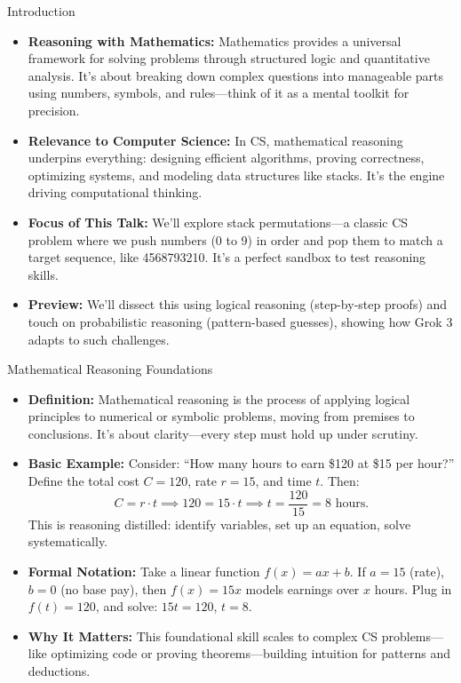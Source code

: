 

\begin{frame}{Introduction}
    \begin{itemize}
        \item \textbf{Reasoning with Mathematics:} Mathematics provides a universal framework for solving problems through structured logic and quantitative analysis. It’s about breaking down complex questions into manageable parts using numbers, symbols, and rules—think of it as a mental toolkit for precision.
        \item \textbf{Relevance to Computer Science:} In CS, mathematical reasoning underpins everything: designing efficient algorithms, proving correctness, optimizing systems, and modeling data structures like stacks. It’s the engine driving computational thinking.
        \item \textbf{Focus of This Talk:} We’ll explore stack permutations—a classic CS problem where we push numbers (0 to 9) in order and pop them to match a target sequence, like 4568793210. It’s a perfect sandbox to test reasoning skills.
        \item \textbf{Preview:} We’ll dissect this using logical reasoning (step-by-step proofs) and touch on probabilistic reasoning (pattern-based guesses), showing how Grok 3 adapts to such challenges.
    \end{itemize}
\end{frame}

\begin{frame}{Mathematical Reasoning Foundations}
    \begin{itemize}
        \item \textbf{Definition:} Mathematical reasoning is the process of applying logical principles to numerical or symbolic problems, moving from premises to conclusions. It’s about clarity—every step must hold up under scrutiny.
        \item \textbf{Basic Example:} Consider: “How many hours to earn \$120 at \$15 per hour?” Define the total cost \( C = 120 \), rate \( r = 15 \), and time \( t \). Then:
        \[
        C = r \cdot t \implies 120 = 15 \cdot t \implies t = \frac{120}{15} = 8 \text{ hours.}
        \]
        This is reasoning distilled: identify variables, set up an equation, solve systematically.
        \item \textbf{Formal Notation:} Take a linear function \( f(x) = ax + b \). If \( a = 15 \) (rate), \( b = 0 \) (no base pay), then \( f(x) = 15x \) models earnings over \( x \) hours. Plug in \( f(t) = 120 \), and solve: \( 15t = 120 \), \( t = 8 \).
        \item \textbf{Why It Matters:} This foundational skill scales to complex CS problems—like optimizing code or proving theorems—building intuition for patterns and deductions.
    \end{itemize}
\end{frame}

